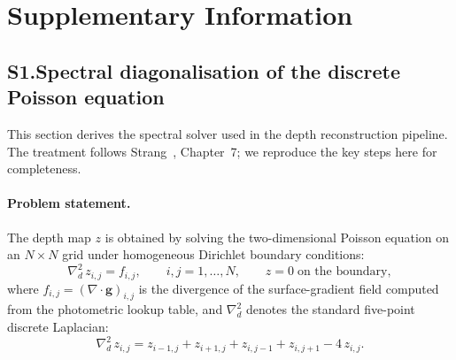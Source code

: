 \documentclass[10pt,a4paper]{article}
\begin{document}
\clearpage


\section*{Supplementary Information}

\setcounter{equation}{0}
\renewcommand{\theequation}{S\arabic{equation}}
\setcounter{figure}{0}
\renewcommand{\thefigure}{S\arabic{figure}}
\setcounter{table}{0}
\renewcommand{\thetable}{S\arabic{table}}


\subsection*{S1.\quad Spectral diagonalisation of the discrete Poisson equation}

This section derives the spectral solver used in the depth reconstruction pipeline. The treatment follows Strang~\cite{strang2007cse}, Chapter~7; we reproduce the key steps here for completeness.

\paragraph{Problem statement.}
The depth map $z$ is obtained by solving the two-dimensional Poisson equation on an $N \times N$ grid under homogeneous Dirichlet boundary conditions:
\begin{equation}
  \nabla^2_d \, z_{i,j} = f_{i,j}, \qquad i,j = 1,\ldots,N, \qquad z = 0 \;\text{on the boundary},
  \label{eq:s_poisson}
\end{equation}
where $f_{i,j} = (\nabla \cdot \mathbf{g})_{i,j}$ is the divergence of the surface-gradient field computed from the photometric lookup table, and $\nabla^2_d$ denotes the standard five-point discrete Laplacian:
\begin{equation}
  \nabla^2_d \, z_{i,j} = z_{i-1,j} + z_{i+1,j} + z_{i,j-1} + z_{i,j+1} - 4\,z_{i,j}.
  \label{eq:s_laplacian}
\end{equation}
\end{document}
